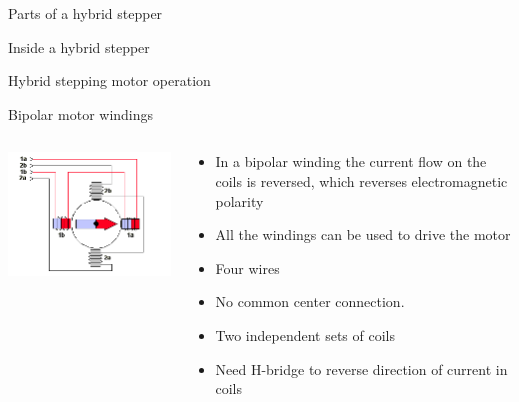 \documentclass[compress]{beamer}
\begin{document}
{
    \begin{frame}{Parts of a hybrid stepper}
    \end{frame}
}

{
    \begin{frame}{Inside a hybrid stepper}
    \end{frame}
}

{
    \begin{frame}{Hybrid stepping motor operation}
    \end{frame}
}

\begin{frame}{Bipolar motor windings}

    \begin{columns}
        \begin{column}{0.5\linewidth}

            \begin{center}
                \includegraphics[width=\linewidth]{bipolar}
            \end{center}
        \end{column}
        \begin{column}{0.5\linewidth}

            \begin{itemize}
                \item In a bipolar winding the current flow on the coils is reversed, which reverses electromagnetic polarity
                \item All the windings can be used to drive the motor
                \item Four wires 
                \item No common center connection. 
                \item Two independent sets of coils
                \item Need H-bridge to reverse direction of current in coils
            \end{itemize}
        \end{column}
    \end{columns}

\end{frame}
\end{document}
